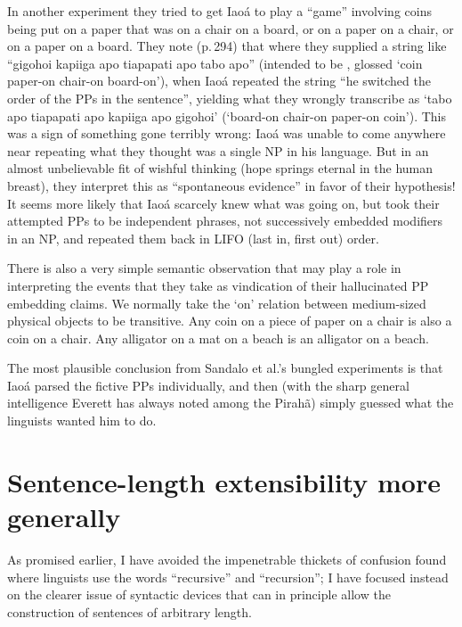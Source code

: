 \documentclass[output=paper,colorlinks,citecolor=brown
]{langscibook}
\begin{document}
In another experiment they tried to get Iao{\'a} to play a ``game''
involving coins being put on a paper that was on a chair on a board,
or on a paper on a chair, or on a paper on a board. They note (p.\,294)
that where they supplied a string like ``gigohoi kapiiga apo tiapapati
apo tabo apo'' (intended to be , glossed `coin paper-on chair-on board-on'),
when Iao{\'a} repeated the string ``he switched the order of the PPs in
the sentence'', yielding what they wrongly transcribe as `tabo apo
tiapapati apo kapiiga apo gigohoi' (`board-on chair-on paper-on coin').
This was a sign of something gone terribly wrong: Iao{\'a} was unable
to come anywhere near repeating what they thought was a single NP in
his language. But in an almost unbelievable fit of wishful thinking
(hope springs eternal in the human breast), they interpret this as
``spontaneous evidence'' in favor of their hypothesis!
It seems more likely that Iao{\'a} scarcely knew what was going on,
but took their attempted PPs to be independent phrases, not
successively embedded modifiers in an NP, and repeated them back in
LIFO (last in, first out) order.

There is also a very simple semantic observation that may play a
role in interpreting the events that they take as vindication of their
hallucinated PP embedding claims. We normally take the `on' relation
between medium-sized physical objects to be transitive. Any coin on
a piece of paper on a chair is also a coin on a chair. Any alligator
on a mat on a beach is an alligator on a beach.

The most plausible conclusion from Sandalo et al.'s bungled experiments
is that Iao{\'a} parsed the fictive PPs individually, and then (with the
sharp general intelligence Everett has always noted among the Pirah{\~a})
simply guessed what the linguists wanted him to do.

\section{Sentence-length extensibility more generally}

As promised earlier, I have avoided the impenetrable thickets of confusion
found where linguists use the words ``recursive'' and ``recursion''; I have
focused instead on the clearer issue of syntactic devices that can in
principle allow the construction of sentences of arbitrary length.
\end{document}
